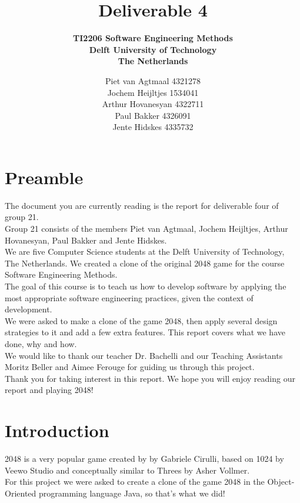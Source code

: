 \documentclass[a4paper,11pt,report]{scrartcl}
\title{\huge\textbf{Deliverable 4}}
\subtitle{\textbf{TI2206 Software Engineering Methods\\
Delft University of Technology\\
The Netherlands}}
\author{Piet van Agtmaal 4321278\\
	    Jochem Heijltjes 1534041\\
		Arthur Hovanesyan 4322711\\
		Paul Bakker 4326091\\
		Jente Hidskes 4335732
	   }
\begin{document}
\begin{titlepage}
\maketitle
\thispagestyle{empty} %
\end{titlepage}

\newpage\section{Preamble}

The document you are currently reading is the report for deliverable four of group 21.\\

Group 21 consists of the members 
Piet van Agtmaal, Jochem Heijltjes, Arthur Hovanesyan, Paul Bakker and Jente Hidskes.\\
We are five Computer Science students at the Delft University of Technology,
The Netherlands. We created a clone of the original 2048 game for the course
Software Engineering Methods.\\

The goal of this course is to teach us how to develop software by applying the most appropriate software engineering practices, given the context of development.\\
We were asked to make a clone of the game 2048, then apply several design strategies to it and add a few extra features. This report covers what we have done, why and how.\\

We would like to thank our teacher Dr. Bachelli and our Teaching Assistants Moritz Beller and Aimee Ferouge for guiding us through this project.\\

Thank you for taking interest in this report. We hope you will enjoy reading our report and playing 2048!

\newpage\section{Introduction}

2048 is a very popular game created by by Gabriele Cirulli, based on 1024 by
Veewo Studio and conceptually similar to Threes by Asher Vollmer.\\
For this project we were asked to create a clone of the game 2048 in the Object-Oriented programming language Java, so that's what we did!\\
\end{document}

